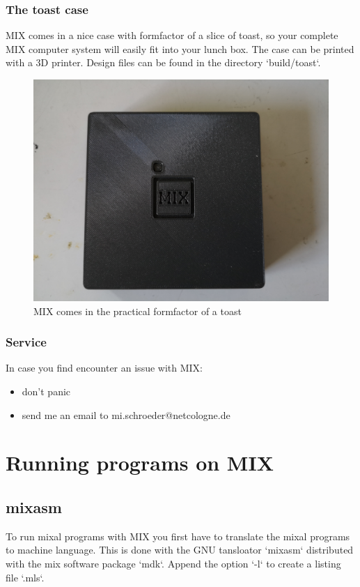 \documentclass[a4paper,ngerman]{scrartcl}
\begin{document}
\subsubsection{The toast case}
MIX comes in a nice case with formfactor of a slice of toast, so your complete MIX computer system will easily fit into your lunch box. The case can be printed with a 3D printer. Design files can be found in the directory `build/toast`.
\begin{figure}[H]
	\centering
	\includegraphics[width=0.7\linewidth]{../MIX_top.jpg}
	\caption{MIX comes in the practical formfactor of a toast}
	\label{fig:mixtop}
\end{figure}


\subsubsection{Service}
In case you find encounter an issue with MIX:
\begin{itemize}
	\item don't panic
	\item send me an email to mi.schroeder@netcologne.de
\end{itemize}

\section{Running programs on MIX}
\subsection{mixasm}
To run mixal programs with MIX you first have to translate the mixal programs to machine language. This is done with the GNU tansloator `mixasm` distributed with the mix software package  `mdk`. Append the option `-l` to create a listing file `.mls`.
\end{document}
